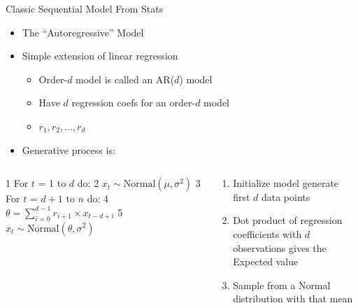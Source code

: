 \documentclass[aspectratio=169]{beamer}
\begin{document}
\begin{frame}[fragile]{Classic Sequential Model From Stats}

\begin{itemize}
\item The ``Autoregressive'' Model
\item Simple extension of linear regression
	\begin{itemize}
		\item Order-$d$ model is called an AR($d$) model
		\item Have $d$ regression coefs for an order-$d$ model
		\item $r_1, r_2, ..., r_d$
	\end{itemize}
\item Generative process is:
\end{itemize}
\begin{columns}
\begin{column}{0.3\textwidth}
\begin{SQL}
1 For $t$ = 1 to $d$ do:
2   $x_t \sim \textrm{Normal}(\mu, \sigma^2)$
3 For $t$ = $d + 1$ to $n$ do:
4  $\theta = \sum_{i = 0}^{d - 1} r_{i + 1} \times x_{t - d + i}$ 
5  $x_t \sim \textrm{Normal}(\theta, \sigma^2)$
\end{SQL}
\end{column}
\begin{column}{0.64\textwidth}
\begin{enumerate}
\item Initialize model  generate first $d$ data points
\vspace{3em}
\addtocounter{enumi}{2}
\item Dot product of regression coefficients with $d$ observations gives the Expected value
\item Sample from a Normal distribution with that mean
\end{enumerate}
\end{column}
\end{columns}

\end{frame}
\end{document}
